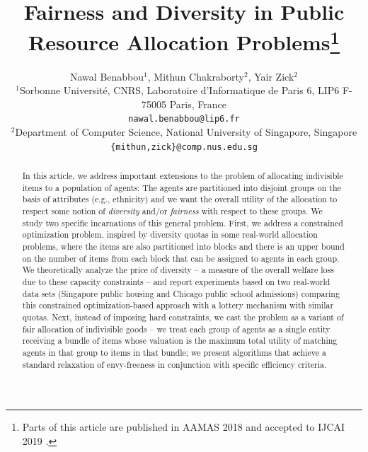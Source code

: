 \documentclass[11pt,dvipdfmx]{article}
\begin{document}
\title{Fairness and Diversity in Public Resource Allocation Problems\footnote{Parts of this article are published in AAMAS 2018 \cite{benabbou2017diversity} and accepted to IJCAI 2019 \cite{benabbou2019fairness}.}}

\author{Nawal Benabbou$^1$, Mithun Chakraborty$^2$, Yair Zick$^2$\\
	$^1$Sorbonne Universit\'e, CNRS, Laboratoire d'Informatique de Paris 6, LIP6 F-75005 Paris, France\\ 
	\texttt{nawal.benabbou@lip6.fr}\\
	$^2$Department of Computer Science, National University of Singapore, Singapore\\
	\texttt{\{mithun,zick\}@comp.nus.edu.sg}
}

\maketitle             

\begin{abstract}
In this article, we address important extensions to the problem of allocating indivisible items to a population of agents: The agents are partitioned into disjoint groups on the basis of attributes (e.g., ethnicity) and we want the overall utility of the allocation to respect some notion of \emph{diversity} and/or \emph{fairness} with respect to these groups. We study two specific incarnations of this general problem. First, we address a constrained optimization problem, inspired by diversity quotas in some real-world allocation problems, where the items are also partitioned into blocks and there is an upper bound on the number of items from each block that can be assigned to agents in each group. We theoretically analyze the price of diversity -- a measure of the overall welfare loss due to these capacity constraints -- and report experiments based on two real-world data sets (Singapore public housing and Chicago public school admissions) comparing this constrained optimization-based approach with a lottery mechanism with similar quotas. Next, instead of imposing hard constraints, we cast the problem as a variant of fair allocation of indivisible goods -- we treat each group of agents as a single entity receiving a bundle of items whose valuation is the maximum total utility of matching agents in that group to items in that bundle; we present algorithms that achieve a standard relaxation of envy-freeness in conjunction with specific efficiency criteria.
\end{abstract}
\end{document}
